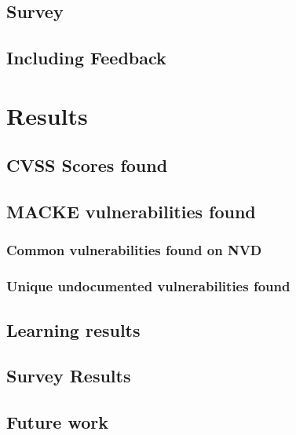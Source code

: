 \subsection{Survey}

\subsection{Including Feedback}

\section{Results}

\subsection{CVSS Scores found}

\subsection{MACKE vulnerabilities found}

\subsubsection{Common vulnerabilities found on NVD}

\subsubsection{Unique undocumented vulnerabilities found}

\subsection{Learning results}

\subsection{Survey Results}

\subsection{Future work}